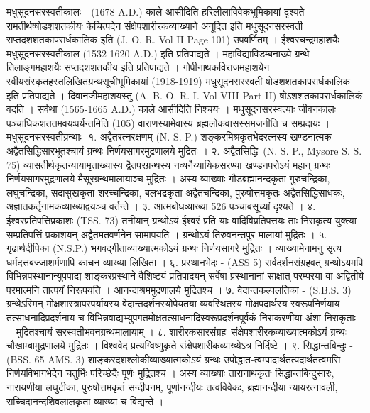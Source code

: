 मधुसूदनसरस्वतीकालः -
(1678 A.D.) काले आसीदिति हरिलीलाविवेकभूमिकायां दृश्यते । रामतीर्थष्षोडशशतकीयः केचित्पदेन संक्षेपशारीरकव्याख्याने अनूदित इति मधुसूदनसरस्वती सप्तदशशतकापरार्धकालिक इति (J. O. R. Vol II Page 101) उपवर्णितम् । ईश्वरचन्द्रमहाशयैः मधुसूदनसरस्वतीकाल (1532-1620 A.D.) इति प्रतिपाद्यते । महाविद्याविडम्बनाख्ये ग्रन्थे तिलाङ्गमहाशयैः सप्तदशशतकीय इति प्रतिपाद्यते । गोपीनाथकविराजमहाशयेन स्वीयसंस्कृतहस्तलिखितग्रन्थसूचीभूमिकायां (1918-1919) मधुसूदनसरस्वती षोडशशतकापरार्धकालिक इति प्रतिपाद्यते । दिवानजीमहाशयस्तु (A. B. O. R. I. Vol VIII Part II) षोऽशशतकापरार्धकालिकं वदति । सर्वथा (1565-1665 A.D.) काले आसीदिति निश्चयः । मधुसूदनसरस्वत्याः जीवनकालः पञ्चाधिकशततमवयःपर्यन्तमिति (105) वाराणस्यामेवास्य ब्रह्मलोकवासस्समजनीति च सम्प्रदायः ।
मधुसूदनसरस्वतीग्रन्थाः-
१. अद्वैतरत्नरक्षणम् (N. S. P.)
शङ्करमिश्रकृतभेदरत्नस्य खण्डनात्मक अद्वैतसिद्धिसारभूतश्चायं ग्रन्थः निर्णयसागरमुद्रणालये मुद्रितः ।
२. अद्वैतसिद्धिः (N. S. P., Mysore S. S. 75)
व्यासतीर्थकृतन्यायामृताख्यास्य द्वैतपरग्रन्थस्य नव्यनैय्यायिकसरण्या खण्डनपरोऽयं महान् ग्रन्थः निर्णयसागरमुद्रणालये मैसूरग्रन्थमालायाञ्च मुद्रितः । अस्य व्याख्याः गौडब्रह्मानन्दकृता गुरुचन्द्रिका, लघुचन्द्रिका, सदासुखकृता शरच्चन्द्रिका, बलभद्रकृता अद्वैतचन्द्रिका, पुरुषोत्तमकृतः अद्वैतसिद्धिसाधकः, अज्ञातकर्तृनामकव्याख्याद्वयञ्च वर्तन्ते ।
३. आत्मबोधव्याख्या 526 पञ्चाबसूच्यां दृश्यते ।
४. ईश्वरप्रतिपत्तिप्रकाशः (TSS. 73)
तनीयान् ग्रन्थोऽयं ईश्वरं प्रति याः वादिविप्रतिपत्तयः ताः निराकृत्य युक्त्या सम्प्रतिपत्तिं प्रकाशयन् अद्वैतमतवर्णनेन सामापयति । ग्रन्थोऽयं तिरुवनन्तपुर मालायां मुद्रितः ।
५. गृढार्थदीपिका (N.S.P.)
भगवद्गीताव्याख्यात्मकोऽयं ग्रन्थः निर्णयसागरे मुद्रितः । व्याख्यामेनामनु सृत्य धर्मदत्तबज्जाशर्मणापि काचन व्याख्या लिखिता ।
६. प्रस्थानभेदः - (ASS 5)
सर्वदर्शनसंग्रहवत् ग्रन्थोऽयमपि विभिन्नपस्थानान्युपपाद्य शाङ्करप्रस्थाने वैशिष्टयं प्रतिपादयन् सर्वेषा प्रस्थानानां साक्षात् परम्परया वा अद्वितीये परमात्मनि तात्पर्यं निरूपयति । आनन्दाश्रममुद्रणालये मुद्रितश्च ।
७. वेदान्तकल्पलतिका - (S.B.S. 3)
ग्रन्थेऽस्मिन् मोक्षशास्त्रापरपर्यायस्य वेदान्तदर्शनस्योपेयतया व्यवस्थितस्य मोक्षपदार्थस्य स्वरूपनिर्णयाय तत्साधनादिप्रदर्शनाय च विभिन्नवाद्यभ्युपगतमोक्षतत्साधनादिस्वरूप्रदर्शनपूर्वकं निराकरणीया अंशा निराकृताः । मुद्रितश्चायं सरस्वतीभवनग्रन्थमालायाम् ।
८. शारीरकसारसंग्रहः 
संक्षेपशारीरकव्याख्यात्मकोऽयं ग्रन्थः चौखाम्बामुद्रणालये मुद्रितः । विश्ववेद प्रत्यग्विष्णुकृते संक्षेपशारीकव्याख्येऽत्र निर्दिष्टे ।
९. सिद्धान्तबिन्दुः - (BSS. 65 AMS. 3)
शाङ्करदशश्लोकीव्याख्यात्मकोऽयं ग्रन्थः उपोद्धात-त्वम्पादार्थतत्पदार्थतत्वमसि निर्णयविभागभेदेन चतुर्भिः परिच्छेदैः पूर्णः मुद्रितश्च । अस्य व्याख्याः तारानाथकृतः सिद्धान्तबिन्दुसारः, नारायणीया लघुटीका, पुरुषोत्तमकृतं सन्दीपनम्, पूर्णानन्दीयः तत्वविवेकः, ब्रह्मानन्दीया न्यायरत्नावली, सच्चिदानन्दशिवलालकृता व्याख्या च विद्यन्ते ।
